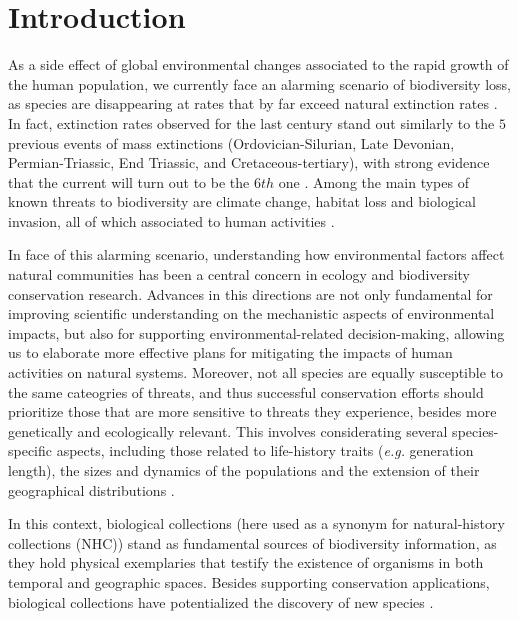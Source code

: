 \chapter{Introduction}\label{introduction}

As a side effect of global environmental changes associated to the rapid growth of the human population, we currently face an alarming scenario of biodiversity loss, as species are disappearing at rates that by far exceed natural extinction rates \cite{Ceballos2015}.
In fact, extinction rates observed for the last century stand out similarly to the $5$ previous events of mass extinctions (Ordovician-Silurian, Late Devonian, Permian-Triassic, End Triassic, and Cretaceous-tertiary), with strong evidence that the current will turn out to be the $6th$ one \cite{Wake2008}.
Among the main types of known threats to biodiversity are climate change, habitat loss and biological invasion, all of which associated to human activities \cite{Wilcove1998}.


In face of this alarming scenario, understanding how environmental factors affect natural communities has been a central concern in ecology and biodiversity conservation research.
Advances in this directions are not only fundamental for improving scientific understanding on the mechanistic aspects of environmental impacts, but also for supporting environmental-related decision-making, allowing us to elaborate more effective plans for mitigating the impacts of human activities on natural systems.
Moreover, not all species are equally susceptible to the same cateogries of threats, and thus successful conservation efforts should prioritize those that are more sensitive to threats they experience, besides more genetically and ecologically relevant.
This involves considerating several species-specific aspects, including those related to life-history traits (\textit{e.g.} generation length), the sizes and dynamics of the populations and the extension of their geographical distributions \cite{iucn_categ_crit}.

In this context, biological collections (here used as a synonym for natural-history collections (NHC)) stand as fundamental sources of biodiversity information, as they hold physical exemplaries that testify the existence of organisms in both temporal and geographic spaces.
Besides supporting conservation applications, biological collections have potentialized the discovery of new species \cite{Kemp2015}.

